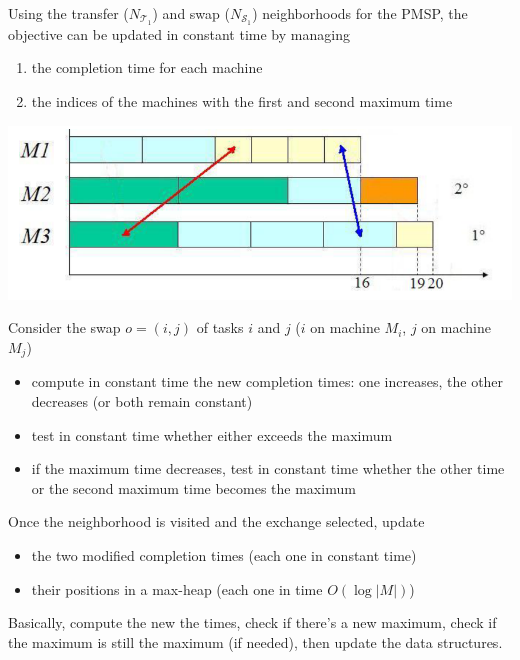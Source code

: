 \documentclass[11pt]{article}
\begin{document}
	Using the transfer ($N_{\mathcal{T}_1}$) and swap ($N_{\mathcal{S}_1}$) neighborhoods for the PMSP, the objective can be updated in constant time by managing
	\begin{enumerate}
		\item the completion time for each machine
		
		\item the indices of the machines with the first and second maximum time
	\end{enumerate}
	
	\begin{center}
		\includegraphics[width=0.75\columnwidth]{img/PMSP2}
	\end{center}
	
	Consider the swap $o = (i, j)$ of tasks $i$ and $j$ ($i$ on machine $M_i$, $j$ on machine $M_j$)
	\begin{itemize}
		\item compute in constant time the new completion times: one increases, the other decreases (or both remain constant)
		
		\item test in constant time whether either exceeds the maximum
		
		\item if the maximum time decreases, test in constant time whether the other time or the second maximum time becomes the maximum
	\end{itemize}
	
	Once the neighborhood is visited and the exchange selected, update
	\begin{itemize}
		\item the two modified completion times (each one in constant time)
		
		\item their positions in a max-heap (each one in time $O (\log |M|)$)
	\end{itemize}
	\nn	
	
	Basically, compute the new the times, check if there's a new maximum, check if the maximum is still the maximum (if needed), then update the data structures. \\
	
\end{document}
